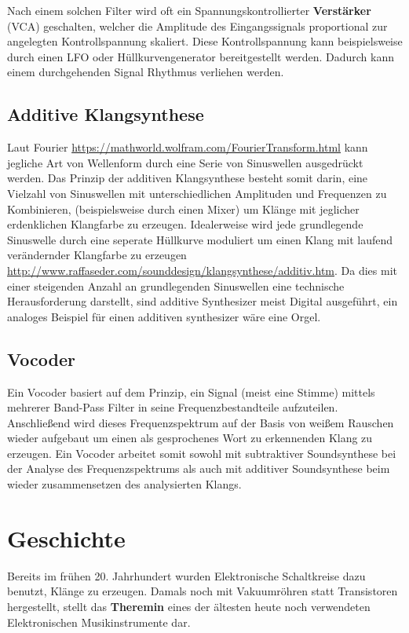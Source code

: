 Nach einem solchen Filter wird oft ein Spannungskontrollierter \textbf{Verstärker} (VCA) geschalten, welcher die Amplitude des Eingangssignals proportional zur angelegten Kontrollspannung skaliert. Diese Kontrollspannung kann beispielsweise durch einen LFO oder Hüllkurvengenerator bereitgestellt werden. Dadurch kann einem durchgehenden Signal Rhythmus verliehen werden.

\subsection{Additive Klangsynthese}
\label{sec:org0f319ac}
Laut Fourier \url{https://mathworld.wolfram.com/FourierTransform.html} kann jegliche Art von Wellenform durch eine Serie von Sinuswellen ausgedrückt werden. Das Prinzip der additiven Klangsynthese besteht somit darin, eine Vielzahl von Sinuswellen mit unterschiedlichen Amplituden und Frequenzen zu Kombinieren, (beispielsweise durch einen Mixer) um Klänge mit jeglicher erdenklichen Klangfarbe zu erzeugen. Idealerweise wird jede grundlegende Sinuswelle durch eine seperate Hüllkurve moduliert um einen Klang mit laufend verändernder Klangfarbe zu erzeugen \url{http://www.raffaseder.com/sounddesign/klangsynthese/additiv.htm}. Da dies mit einer steigenden Anzahl an grundlegenden Sinuswellen eine technische Herausforderung darstellt, sind additive Synthesizer meist Digital ausgeführt, ein analoges Beispiel für einen additiven synthesizer wäre eine Orgel.

\subsection{Vocoder}
\label{sec:orge65c413}
Ein Vocoder basiert auf dem Prinzip, ein Signal (meist eine Stimme) mittels mehrerer Band-Pass Filter in seine Frequenzbestandteile aufzuteilen. Anschließend wird dieses Frequenzspektrum auf der Basis von weißem Rauschen wieder aufgebaut um einen als gesprochenes Wort zu erkennenden Klang zu erzeugen. Ein Vocoder arbeitet somit sowohl mit subtraktiver Soundsynthese bei der Analyse des Frequenzspektrums als auch mit additiver Soundsynthese beim wieder zusammensetzen des analysierten Klangs.

\section{Geschichte}
\label{sec:org11d755a}
Bereits im frühen 20. Jahrhundert wurden Elektronische Schaltkreise dazu benutzt, Klänge zu erzeugen. Damals noch mit Vakuumröhren statt Transistoren hergestellt, stellt das \textbf{Theremin} eines der ältesten heute noch verwendeten Elektronischen Musikinstrumente dar.


